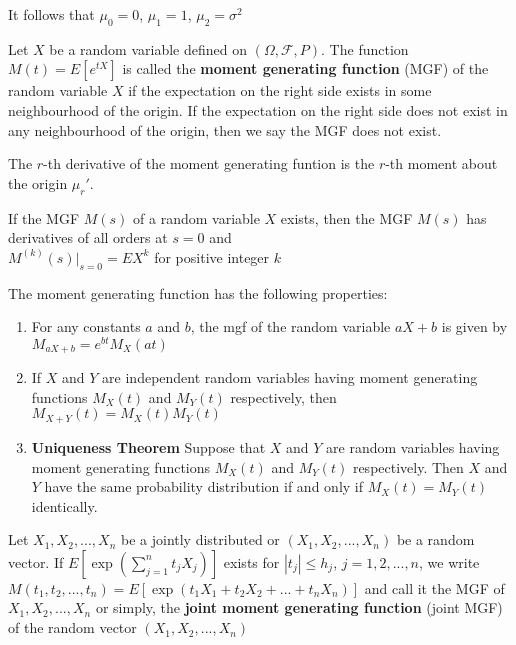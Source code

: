 It follows that $\mu_0 = 0$, $\mu_1 = 1$, $\mu_2 = \sigma ^2$

\begin{defn}
    Let $X$ be a random variable defined on $\left (\Omega,  \mathcal{F}, P\right )$. The function $M\left (t\right ) = E\left [e ^{t X}\right ]$ is called the \textbf{moment generating function} (MGF) of the random variable $X$ if the expectation on the right side exists in some neighbourhood of the origin. If the expectation on the right side does not exist in any neighbourhood of the origin, then we say the MGF does not exist.
\end{defn}

\begin{samepage}
The $r$-th derivative of the moment generating funtion is the $r$-th moment about the origin $\mu_r '$.
\begin{thm}
    If the MGF $M(s)$ of a random variable $X$ exists, then the MGF $M(s)$ has derivatives of all orders at $s=0$ and \\

    $M^{(k)} (s) |_{s=0} = EX^k$ for positive integer $k$
\end{thm}

\end{samepage}
\begin{thm}
    The moment generating function has the following properties:
    \begin{enumerate}
        \item For any constants $a$ and $b$, the mgf of the random variable $a X + b$ is given by $M_{aX+b} = e^{bt} M_X(at)$
        \item If $X$ and $Y$ are independent random variables having moment generating functions $M_X(t)$ and $M_Y(t)$ respectively, then $M_{X+Y}(t) = M_X(t) M_Y(t)$
        \item \textbf{Uniqueness Theorem} Suppose that $X$ and $Y$ are random variables having moment generating functions $M_X(t)$ and $M_Y(t)$ respectively. Then $X$ and $Y$ have the same probability distribution if and only if $M_X(t) = M_Y(t)$ identically.
    \end{enumerate}
\end{thm}

\begin{defn}
    Let $X_1, X_2, ..., X_n$ be a jointly distributed or $(X_1, X_2, ..., X_n)$ be a random vector. If $E[\exp ( \sum_{j=1}^n t_j X_j )]$ exists for $|t_j| \leq h_j$, $j = 1, 2, ...,n$, we write $M(t_1, t_2, ..., t_n) = E[\exp(t_1 X_1 + t_2 X_2 + ... + t_n X_n)]$ and call it the MGF of $X_1, X_2, ..., X_n$ or simply, the \textbf{joint moment generating function} (joint MGF) of the random vector $(X_1, X_2, ..., X_n)$
\end{defn}

